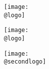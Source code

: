 \begin{titlepage}
    \begin{center}
      \makeatletter 
        \begin{figure}[!htb]
          \centering
          
          \ifx\@secondlogo\none
            \begin{minipage}{0.42\textwidth}
            \centering       
            \texttt{[image: \\@logo]}
            \end{minipage}
          \else
            \begin{minipage}{0.42\textwidth}
            \centering       
            \texttt{[image: \\@logo]}
            \end{minipage}
            \hspace{1cm}
            \begin{minipage}{0.42\textwidth}
            \centering       
            \texttt{[image: \\@secondlogo]}
            \end{minipage}
          \fi

        \end{figure}
      \makeatother
      \vspace*{0.25cm}

        \maketitle

        \vspace{2cm}
        \large 
        \makeatletter
        \textbf{\@keywords}
        \makeatother
        

\end{center}
\end{titlepage}
